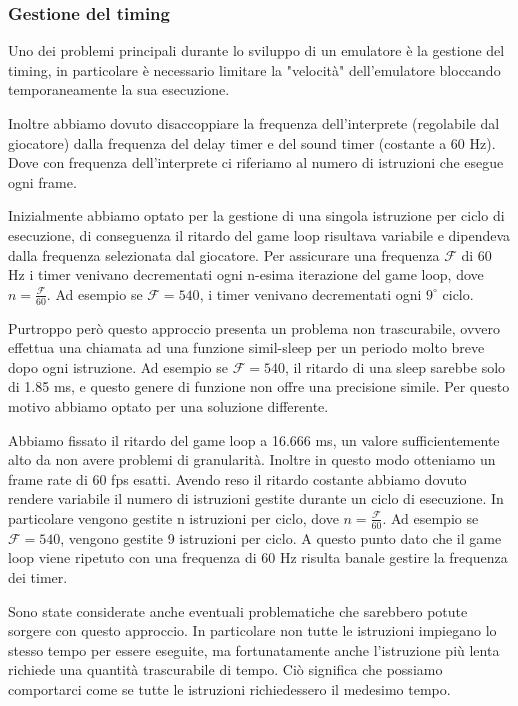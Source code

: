 \documentclass[a4paper]{article}
\begin{document}
\subsubsection{Gestione del timing}

Uno dei problemi principali durante lo sviluppo di un emulatore è
la gestione del timing, in particolare è necessario limitare la
"velocità" dell'emulatore bloccando temporaneamente la sua
esecuzione.

Inoltre abbiamo dovuto disaccoppiare la frequenza dell'interprete
(regolabile dal giocatore) dalla frequenza del delay timer e del
sound timer (costante a 60 Hz). Dove con frequenza dell'interprete
ci riferiamo al numero di istruzioni che esegue ogni frame.


Inizialmente abbiamo optato per la gestione di una singola istruzione per ciclo di esecuzione,
di conseguenza il ritardo del game loop risultava variabile e dipendeva dalla frequenza selezionata
dal giocatore. Per assicurare una frequenza $\mathcal{F}$ di 60 Hz i timer venivano decrementati
ogni n-esima iterazione del game loop, dove $n = \frac{\mathcal{F}}{60}$. Ad esempio se
$\mathcal{F} = 540$, i timer venivano decrementati ogni $9^{\circ}$ ciclo.

Purtroppo però questo approccio presenta un problema non trascurabile, ovvero effettua una chiamata
ad una funzione simil-sleep per un periodo molto breve dopo ogni istruzione. Ad esempio se
$\mathcal{F} = 540$, il ritardo di una sleep sarebbe solo di 1.85 ms, e questo genere di funzione
non offre una precisione simile. Per questo motivo abbiamo optato per una soluzione differente.

Abbiamo fissato il ritardo del game loop a 16.666 ms, un valore sufficientemente alto da non avere
problemi di granularità. Inoltre in questo modo otteniamo un frame rate di 60 fps esatti.
Avendo reso il ritardo costante abbiamo dovuto rendere variabile il numero di istruzioni gestite
durante un ciclo di esecuzione. In particolare vengono gestite n istruzioni per ciclo,
dove $n = \frac{\mathcal{F}}{60}$. Ad esempio se $\mathcal{F} = 540$, vengono gestite 9 istruzioni
per ciclo. A questo punto dato che il game loop viene ripetuto con una frequenza di 60 Hz risulta
banale gestire la frequenza dei timer.

Sono state considerate anche eventuali problematiche che sarebbero potute sorgere con questo
approccio. In particolare non tutte le istruzioni impiegano lo stesso tempo per essere eseguite,
ma fortunatamente anche l'istruzione più lenta richiede una quantità trascurabile di tempo.
Ciò significa che possiamo comportarci come se tutte le istruzioni richiedessero il medesimo tempo.
\end{document}
